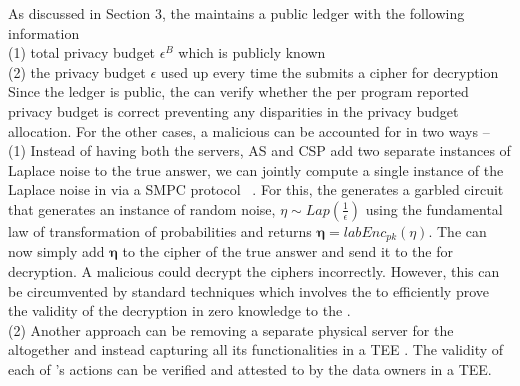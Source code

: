 As discussed in Section 3, the \CSP maintains a public ledger with the following information\\
(1) total privacy budget $\epsilon^B$ which is publicly known
\\(2) the privacy budget $\epsilon$ used up every time the \AS submits a cipher for decryption\\
Since the ledger is public, the \AS can verify whether the per program reported privacy budget is correct preventing any disparities in the privacy budget allocation.
For the other cases, a malicious \CSP can be accounted for in two ways --\\
(1)  Instead of having  both the servers, \textsf{AS} and \textsf{CSP} add two separate instances of Laplace noise to the true answer, we can jointly compute a single instance of the Laplace noise in \system via a SMPC protocol ~\cite{Djoin,DworkOurData}. For this, the \CPS generates a garbled circuit that generates an instance of random noise, $\eta \sim Lap(\frac{1}{\epsilon})$ using the fundamental law of transformation of probabilities and returns $\boldsymbol{\eta}=labEnc_{pk}(\eta)$. 
The \AS can now simply add $\boldsymbol{\eta}$ to the cipher of the true answer and send it to the \CSP for decryption. A malicious \CSP could decrypt the ciphers incorrectly. However, this can be circumvented by standard techniques which involves the \CSP to efficiently prove the validity of the decryption in zero knowledge to the \AS.\\
(2)  Another approach can be removing a separate physical server for the \CSP altogether and instead capturing all its functionalities in a TEE \cite{Boneh2,Prochlo,Aïmeur2008}. The validity of each of \CSP's actions can be verified and attested to by the data owners in a TEE.
